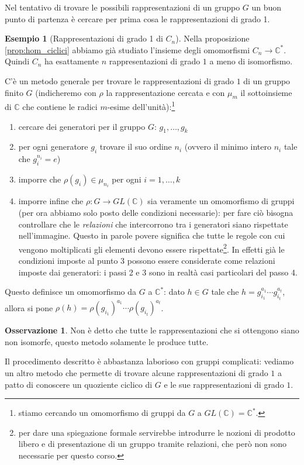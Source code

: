 \documentclass[11pt]{article}
\theoremstyle{plain}
\theoremstyle{definition}
\newtheorem{exmp}{Esempio}[section]
\newtheorem*{rem}{Osservazione}
\theoremstyle{remark}
\newcommand{\C}{\mathbb{C}}
\begin{document}
Nel tentativo di trovare le possibili rappresentazioni di un gruppo $G$ un buon punto di partenza è cercare per prima cosa le rappresentazioni di grado 1.
\begin{exmp}[Rappresentazioni di grado 1 di $C_n$]
Nella proposizione \ref{prop:hom_ciclici} abbiamo già studiato l'insieme degli omomorfismi $C_n\to\C^*$.
Quindi $C_n$ ha esattamente $n$ rappresentazioni di grado $1$ a meno di isomorfismo.
\end{exmp}
C'è un metodo generale per trovare le rappresentazioni di grado $1$ di un gruppo finito $G$ (indicheremo con $\rho$ la rappresentazione cercata e con $\mu_m$ il sottoinsieme di $\C$ che contiene le radici $m$-esime dell'unità):\footnote{stiamo cercando un omomorfismo di gruppi da $G$ a $GL(\C)=\C^*$.}
\begin{enumerate}
	\item cercare dei generatori per il gruppo $G$: $g_1, \ldots, g_k$
	\item per ogni generatore $g_i$ trovare il suo ordine $n_i$ (ovvero il minimo intero $n_i$ tale che $g_i^{n_i}=e$)
	\item imporre che $\rho(g_i)\in \mu_{n_i}$ per ogni $i=1,\ldots,k$
	\item imporre infine che $\rho:G\to GL(\C)$ sia veramente un omomorfismo di gruppi (per ora abbiamo solo posto delle condizioni necessarie):
	 per fare ciò bisogna controllare che le \emph{relazioni} che intercorrono tra i generatori siano rispettate nell'immagine. Questo in parole povere significa che tutte le regole con cui vengono moltiplicati gli elementi devono essere rispettate\footnote{per dare una spiegazione formale servirebbe introdurre le nozioni di prodotto libero e di presentazione di un gruppo tramite relazioni, che però non sono necessarie per questo corso.}.
	 In effetti già le condizioni imposte al punto 3 possono essere considerate come relazioni imposte dai generatori: i passi 2 e 3 sono in realtà casi particolari del passo 4.
\end{enumerate}
Questo definisce un omomorfismo da $G$ a $\C^*$: dato $h\in G$ tale che $h=g_{i_1}^{a_1}\cdots g_{i_t}^{a_t}$, allora si pone $\rho(h) = \rho(g_{i_1})^{a_1}\cdots \rho(g_{i_t})^{a_t}$.
\begin{rem}
	Non è detto che tutte le rappresentazioni che si ottengono siano non isomorfe, questo metodo solamente le produce tutte.
\end{rem}

Il procedimento descritto è abbastanza
laborioso con gruppi complicati: vediamo un altro metodo che permette di trovare alcune rappresentazioni
di grado $1$ a patto di conoscere un quoziente ciclico di $G$ e le sue rappresentazioni di grado $1$.
\end{document}

